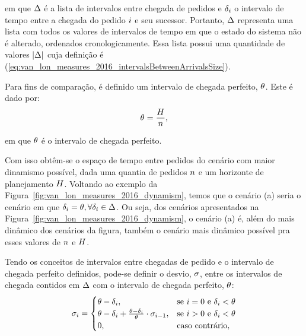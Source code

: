 \noindent em que $\Delta$ é a lista de intervalos entre 
chegada de pedidos e $\delta_i$ o intervalo de tempo 
entre a chegada do pedido $i$ e seu sucessor. 
Portanto, $\Delta$ representa uma lista com todos os valores
de intervalos de tempo em que o estado do sistema não é alterado, ordenados
cronologicamente.
Essa lista possui uma quantidade de valores $|\Delta|$ 
cuja definição é (\ref{eq:van_lon_measures_2016_intervalsBetweenArrivalsSize}).

Para fins de comparação, é definido um intervalo de chegada perfeito,
$\theta$. Este é dado por:
%
\begin{equation}
    \theta = \frac{H}{n},
    \label{eq:van_lon_measures_2016_perfectInterval}
  \end{equation}

\noindent em que $\theta$ é o intervalo de chegada perfeito.

Com isso obtêm-se o espaço de tempo entre pedidos do cenário com maior
dinamismo possível, dada uma quantia de pedidos $n$ 
e um horizonte de planejamento $H$.
Voltando ao exemplo da Figura~\ref{fig:van_lon_measures_2016_dynamism},
temos que o cenário (a) seria o cenário em que
$\delta_i = \theta, \forall
\delta_i \in \Delta$.
Ou seja, dos cenários apresentados na 
Figura~\ref{fig:van_lon_measures_2016_dynamism}, o cenário (a) é, além do mais
dinâmico dos cenários da figura, também o cenário mais dinâmico possível pra
esses valores de $n$ e $H$.

Tendo os conceitos de intervalos entre chegadas de pedido e o intervalo de
chegada perfeito definidos, pode-se definir o desvio,
$\sigma$, entre os intervalos de chegada contidos em
$\Delta$ com o intervalo de chegada perfeito,
$\theta$:
%
\begin{equation}
    \sigma_i =
        \begin{cases}
            \theta - \delta_i,
            & \text{se $i = 0$ 
                    e $\delta_i < \theta$} \\
            \theta - \delta_i 
            + \frac{\theta-\delta_i}
                   {\theta}
            \cdot \sigma_{i-1},
            & \text{se $i > 0$ 
                    e $\delta_i < \theta$} \\
            0, & \text{caso contrário},
        \end{cases}
    \label{eq:van_lon_measures_2016_deviationFromPerfectInterval}
\end{equation}

